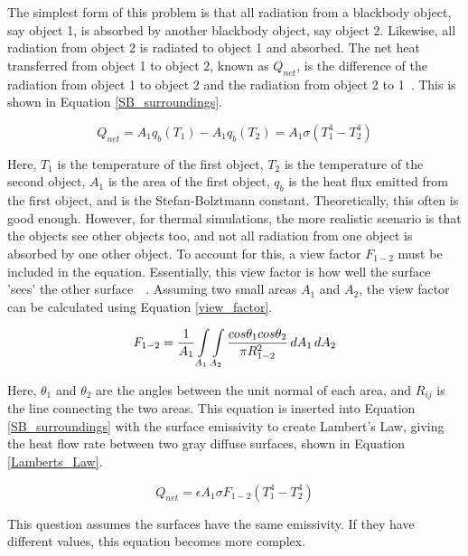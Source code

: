 The simplest form of this problem is that all radiation from a blackbody object, say object 1, is absorbed by another blackbody object, say object 2. Likewise, all radiation from object 2 is radiated to object 1 and absorbed. The net heat transferred from object 1 to object 2, known as $Q_{net}$, is the difference of the radiation from object 1 to object 2 and the radiation from object 2 to 1~\citep{heat_transfer_textbook}. This is shown in Equation \ref{SB_surroundings}.

\begin{equation}\label{SB_surroundings}
    Q_{net} = A_1 q_b (T_1) - A_1 q_b (T_2) = A_1 \sigma (T_1^4 - T_2^4)
\end{equation}

Here, $T_1$ is the temperature of the first object, $T_2$ is the temperature of the second object, $A_1$ is the area of the first object, $q_b$ is the heat flux emitted from the first object, and {\textsigma} is the Stefan-Bolztmann constant. Theoretically, this often is good enough. However, for thermal simulations, the more realistic scenario is that the objects see other objects too, and not all radiation from one object is absorbed by one other object. To account for this, a view factor $F_{1-2}$ must be included in the equation. Essentially, this view factor is how well the surface 'sees' the other surface~\citep{heat_transfer_textbook}~\citep{FEA_SW}. Assuming two small areas $A_1$ and $A_2$, the view factor can be calculated using Equation \ref{view_factor}.

\begin{equation}\label{view_factor}
    F_{1-2} = \frac{1}{A_1} \int\limits_{A_1} \int\limits_{A_2} \frac{cos \theta_1 cos \theta_2}{\pi R_{1-2}^2} \,dA_1\,dA_2
\end{equation}

Here, $\theta_1$ and $\theta_2$ are the angles between the unit normal of each area, and $R_{ij}$ is the line connecting the two areas. This equation is inserted into Equation \ref{SB_surroundings} with the surface emissivity to create Lambert's Law, giving the heat flow rate between two gray diffuse surfaces, shown in Equation \ref{Lamberts_Law}.

\begin{equation}\label{Lamberts_Law}
    Q_{net} = \epsilon A_1 \sigma F_{1-2} (T_1^4 - T_2^4)
\end{equation}

This question assumes the surfaces have the same emissivity. If they have different values, this equation becomes more complex.

